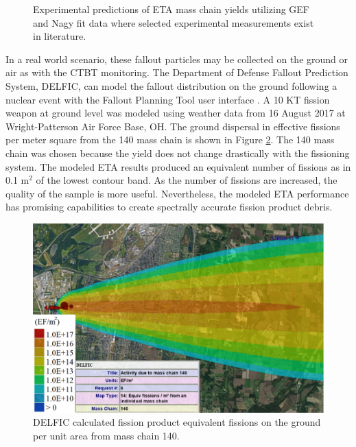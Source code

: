 \begin{figure}[!htbp]
	\centering
	\vfill
	\vfill
	\vfill
	\caption{Experimental predictions of ETA mass chain yields utilizing GEF and Nagy fit data where selected experimental measurements exist in literature.}
	\label{fig:fp4}
\end{figure}

In a real world scenario, these fallout particles may be collected on the ground or air as with the CTBT monitoring. 
The Department of Defense Fallout Prediction System, DELFIC, can model the fallout distribution on the ground following a nuclear event with the Fallout Planning Tool user interface \cite{DELFIC, Jodoin2011}. 
A 10 KT fission weapon at ground level was modeled using weather data from 16 August 2017 at Wright-Patterson Air Force Base, OH. 
The ground dispersal in effective fissions per meter square from the 140 mass chain is shown in Figure \ref{fig:delfic}.
The 140 mass chain was chosen because the yield does not change drastically with the fissioning system. 
The modeled ETA results produced an equivalent number of fissions as in 0.1 m$^{2}$ of the lowest contour band. 
As the number of fissions are increased, the quality of the sample is more useful. 
Nevertheless, the modeled ETA performance has promising capabilities to create spectrally accurate fission product debris. 

\begin{figure}[!htbp]
	\centering
	\includegraphics[width=13cm]{Figures/Chapter5/FP_m2.png}
	\caption{DELFIC calculated fission product equivalent fissions on the ground per unit area from mass chain 140.}
	\label{fig:delfic}
\end{figure}

